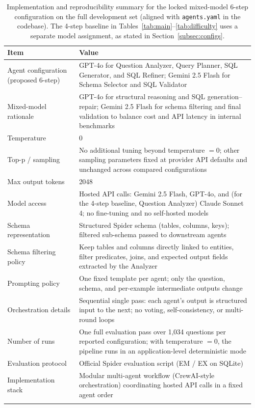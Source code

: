 \begin{table}[t]
\caption{Implementation and reproducibility summary for the locked mixed-model 6-step configuration on the full development set (aligned with \texttt{agents.yaml} in the codebase). The 4-step baseline in Tables~\ref{tab:main}--\ref{tab:difficulty} uses a separate model assignment, as stated in Section~\ref{subsec:configs}.}\label{tab:repro}%
\scriptsize
\begin{tabular*}{\textwidth}{@{\extracolsep{\fill}}p{3.4cm}p{9.8cm}@{}}
\toprule
Item & Value \\
\midrule
Agent configuration (proposed 6-step) & GPT-4o for Question Analyzer, Query Planner, SQL Generator, and SQL Refiner; Gemini 2.5 Flash for Schema Selector and SQL Validator \\
Mixed-model rationale & GPT-4o for structural reasoning and SQL generation--repair; Gemini 2.5 Flash for schema filtering and final validation to balance cost and API latency in internal benchmarks \\
Temperature & 0 \\
Top-p / sampling & No additional tuning beyond temperature $=0$; other sampling parameters fixed at provider API defaults and unchanged across compared configurations \\
Max output tokens & 2048 \\
Model access & Hosted API calls: Gemini 2.5 Flash, GPT-4o, and (for the 4-step baseline, Question Analyzer) Claude Sonnet 4; no fine-tuning and no self-hosted models \\
Schema representation & Structured Spider schema (tables, columns, keys); filtered sub-schema passed to downstream agents \\
Schema filtering policy & Keep tables and columns directly linked to entities, filter predicates, joins, and expected output fields extracted by the Analyzer \\
Prompting policy & One fixed template per agent; only the question, schema, and per-example intermediate outputs change \\
Orchestration details & Sequential single pass: each agent's output is structured input to the next; no voting, self-consistency, or multi-round loops \\
Number of runs & One full evaluation pass over 1,034 questions per reported configuration; with temperature $=0$, the pipeline runs in an application-level deterministic mode \\
Evaluation protocol & Official Spider evaluation script (EM / EX on SQLite) \\
Implementation stack & Modular multi-agent workflow (CrewAI-style orchestration) coordinating hosted API calls in a fixed agent order \\
\botrule
\end{tabular*}
\end{table}

